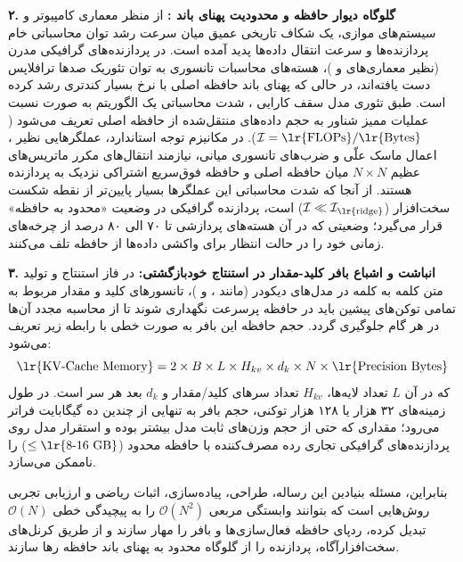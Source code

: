 \documentclass[12pt,a4paper]{report}
\theoremstyle{definition}
\begin{document}
\textbf{۲. گلوگاه دیوار حافظه  و محدودیت پهنای باند :}
از منظر معماری کامپیوتر و سیستم‌های موازی، یک شکاف تاریخی عمیق میان سرعت رشد توان محاسباتی خام پردازنده‌ها و سرعت انتقال داده‌ها پدید آمده است. در پردازنده‌های گرافیکی مدرن (نظیر معماری‌های  و )، هسته‌های محاسبات تانسوری  به توان تئوریک صدها ترافلاپس دست یافته‌اند، در حالی که پهنای باند حافظه اصلی  با نرخ بسیار کندتری رشد کرده است. طبق تئوری مدل سقف کارایی ، شدت محاسباتی  یک الگوریتم به صورت نسبت عملیات ممیز شناور به حجم داده‌های منتقل‌شده از حافظه اصلی تعریف می‌شود ($\mathcal{I} = \text{\lr{FLOPs}} / \text{\lr{Bytes}}$). در مکانیزم توجه استاندارد، عملگرهایی نظیر ، اعمال ماسک علّی و ضرب‌های تانسوری میانی، نیازمند انتقال‌های مکرر ماتریس‌های عظیم $N \times N$ میان حافظه اصلی  و حافظه فوق‌سریع اشتراکی نزدیک به پردازنده  هستند. از آنجا که شدت محاسباتی این عملگرها بسیار پایین‌تر از نقطه شکست سخت‌افزار ($\mathcal{I} \ll \mathcal{I}_{\text{\lr{ridge}}}$) است، پردازنده گرافیکی در وضعیت «محدود به حافظه»  قرار می‌گیرد؛ وضعیتی که در آن هسته‌های پردازشی تا ۷۰ الی ۸۰ درصد از چرخه‌های زمانی خود را در حالت انتظار برای واکشی داده‌ها از حافظه تلف می‌کنند.

\textbf{۳. انباشت و اشباع بافر کلید-مقدار  در استنتاج خودبازگشتی:}
در فاز استنتاج و تولید متن کلمه به کلمه در مدل‌های دیکودر (مانند ،  و )، تانسورهای کلید و مقدار مربوط به تمامی توکن‌های پیشین باید در حافظه پرسرعت  نگهداری شوند تا از محاسبه مجدد آن‌ها در هر گام جلوگیری گردد. حجم حافظه این بافر به صورت خطی با رابطه زیر تعریف می‌شود:
\begin{equation}
\text{\lr{KV-Cache Memory}} = 2 \times B \times L \times H_{kv} \times d_k \times N \times \text{\lr{Precision Bytes}}
\end{equation}
که در آن $L$ تعداد لایه‌ها، $H_{kv}$ تعداد سرهای کلید/مقدار و $d_k$ بعد هر سر است. در طول زمینه‌های ۳۲ هزار یا ۱۲۸ هزار توکنی، حجم بافر  به تنهایی از چندین ده گیگابایت فراتر می‌رود؛ مقداری که حتی از حجم وزن‌های ثابت مدل بیشتر بوده و استقرار مدل روی پردازنده‌های گرافیکی تجاری رده مصرف‌کننده با حافظه محدود ($\le \text{\lr{8-16 GB}}$) را ناممکن می‌سازد.

بنابراین، مسئله بنیادین این رساله، طراحی، پیاده‌سازی، اثبات ریاضی و ارزیابی تجربی روش‌هایی است که بتوانند وابستگی مربعی $\mathcal{O}(N^2)$ را به پیچیدگی خطی $\mathcal{O}(N)$ تبدیل کرده، ردپای حافظه فعال‌سازی‌ها و بافر  را مهار سازند و از طریق کرنل‌های سخت‌افزارآگاه، پردازنده را از گلوگاه محدود به پهنای باند حافظه رها سازند.
\end{document}
